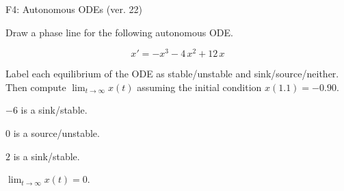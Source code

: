 \begin{exercise}
  \begin{exerciseTitle}F4: Autonomous ODEs (ver. 22)\end{exerciseTitle}
  \begin{exerciseStatement}
    

      Draw a phase line for the following 
      autonomous ODE.
    

    
\[x'= -x^{3} - 4 \, x^{2} + 12 \, x\]

    

      Label each equilibrium of the ODE
      as stable/unstable and sink/source/neither.
      Then compute \(\lim_{t\to\infty}x(t)\)
      assuming the initial condition
      \(x( 1.1 )= -0.90\).
    

  \end{exerciseStatement}
  \begin{exerciseAnswer}
    

      \(-6\) is a sink/stable.
      
        \(0\) is a source/unstable.
      
      \(2\) is a sink/stable.
    

    

      \(\lim_{t\to\infty}x(t)=0\).
    

  \end{exerciseAnswer}
\end{exercise}
